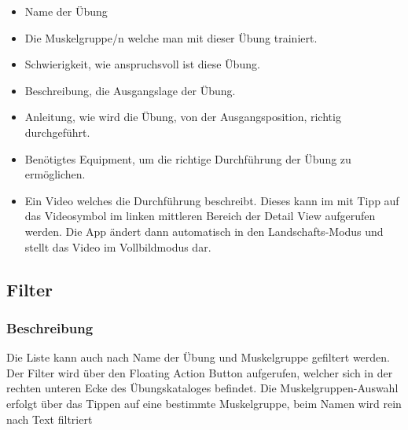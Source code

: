 \documentclass[FIPLY_base.tex]{subfiles}
\begin{document}
\begin{itemize}
\item Name der Übung
\item Die Muskelgruppe/n welche man mit dieser Übung trainiert.
\item Schwierigkeit, wie anspruchsvoll ist diese Übung.
\item Beschreibung, die Ausgangslage der Übung.
\item Anleitung, wie wird die Übung, von der Ausgangsposition, richtig durchgeführt.
\item Benötigtes Equipment, um die richtige Durchführung der Übung zu ermöglichen.
\item Ein Video welches die Durchführung beschreibt. Dieses kann im mit Tipp auf das Videosymbol im linken mittleren Bereich der Detail View aufgerufen werden.
Die App ändert dann automatisch in den Landschafts-Modus und stellt das Video im Vollbildmodus dar.

\end{itemize}



\subsection{Filter}
\subsubsection{Beschreibung}
Die Liste kann auch nach Name der Übung und Muskelgruppe gefiltert werden. 
Der Filter wird über den Floating Action Button aufgerufen, welcher sich in der rechten unteren Ecke des Übungskataloges befindet.
Die Muskelgruppen-Auswahl erfolgt über das Tippen auf eine bestimmte Muskelgruppe, beim Namen wird rein nach Text filtriert
\end{document}
